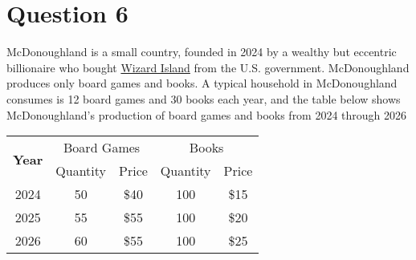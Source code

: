 \documentclass{article}
\newcommand{\question}[1]{\pagebreak\section{Question #1}}
\begin{document}
\pagebreak

\question{6}

McDonoughland is a small country, founded in 2024 by a wealthy but eccentric billionaire who bought \href{https://www.youtube.com/watch?v=dQw4w9WgXcQ}{Wizard Island} from the U.S. government. McDonoughland produces only board games and books. A typical household in McDonoughland consumes is 12 board games and 30 books each year, and the table below shows McDonoughland's production of board games and books from 2024 through 2026

\begin{table}[h]
    \centering
    \begin{tabular}{c|cc|cc}
    \multirow{2}{*}{\textbf{Year}} & \multicolumn{2}{c|}{Board Games} & \multicolumn{2}{c}{Books} \\ \cline{2-5} 
     & \multicolumn{1}{c|}{Quantity} & Price & \multicolumn{1}{c|}{Quantity} & Price \\ \hline
    2024 & \multicolumn{1}{c|}{50} & \$40 & \multicolumn{1}{c|}{100} & \$15 \\
    2025 & \multicolumn{1}{c|}{55} & \$55 & \multicolumn{1}{c|}{100} & \$20 \\
    2026 & \multicolumn{1}{c|}{60} & \$55 & \multicolumn{1}{c|}{100} & \$25
    \end{tabular}
    \end{table}
\end{document}
